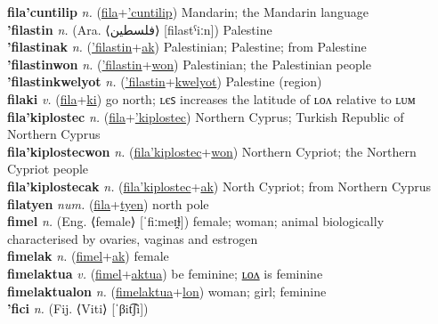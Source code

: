 \textbf{fila'cuntilip} \textit{n.} (\hyperref[fila]{fila}+\hyperref['cuntilip]{'cuntilip})
Mandarin; the Mandarin language \label{fila'cuntilip} \\
\textbf{'filastin} \textit{n.} (Ara. ⟨فلسطين⟩ [filastˁiːn])
Palestine \label{'filastin} \\
\textbf{'filastinak} \textit{n.} (\hyperref['filastin]{'filastin}+\hyperref[ak]{ak})
Palestinian; Palestine; from Palestine \label{'filastinak} \\
\textbf{'filastinwon} \textit{n.} (\hyperref['filastin]{'filastin}+\hyperref[won]{won})
Palestinian; the Palestinian people \label{'filastinwon} \\
\textbf{'filastinkwelyot} \textit{n.} (\hyperref['filastin]{'filastin}+\hyperref[kwelyot]{kwelyot})
Palestine (region) \label{'filastinkwelyot} \\
\textbf{filaki} \textit{v.} (\hyperref[fila]{fila}+\hyperref[ki]{ki})
go north; ʟєꜱ increases the latitude of ʟᴏᴧ relative to ʟᴜᴍ \label{filaki} \\
\textbf{fila'kiplostec} \textit{n.} (\hyperref[fila]{fila}+\hyperref['kiplostec]{'kiplostec})
Northern Cyprus; Turkish Republic of Northern Cyprus \label{fila'kiplostec} \\
\textbf{fila'kiplostecwon} \textit{n.} (\hyperref[fila'kiplostec]{fila'kiplostec}+\hyperref[won]{won})
Northern Cypriot; the Northern Cypriot people \label{fila'kiplostecwon} \\
\textbf{fila'kiplostecak} \textit{n.} (\hyperref[fila'kiplostec]{fila'kiplostec}+\hyperref[ak]{ak})
North Cypriot; from Northern Cyprus \label{fila'kiplostecak} \\
\textbf{filatyen} \textit{num.} (\hyperref[fila]{fila}+\hyperref[tyen]{tyen})
north pole \label{filatyen} \\
\textbf{fimel} \textit{n.} (Eng. ⟨female⟩ [ˈfiːmeɪ̯ɫ])
female; woman; animal biologically characterised by ovaries, vaginas and estrogen \label{fimel} \\
\textbf{fimelak} \textit{n.} (\hyperref[fimel]{fimel}+\hyperref[ak]{ak})
female \label{fimelak} \\
\textbf{fimelaktua} \textit{v.} (\hyperref[fimel]{fimel}+\hyperref[aktua]{aktua})
be feminine; \hyperref[fimelaktualon]{ʟᴏᴧ} is feminine \label{fimelaktua} \\
\textbf{fimelaktualon} \textit{n.} (\hyperref[fimelaktua]{fimelaktua}+\hyperref[lon]{lon})
woman; girl; feminine \label{fimelaktualon} \\
\textbf{'fici} \textit{n.} (Fij. ⟨Viti⟩ [ˈβit͡ʃi])
